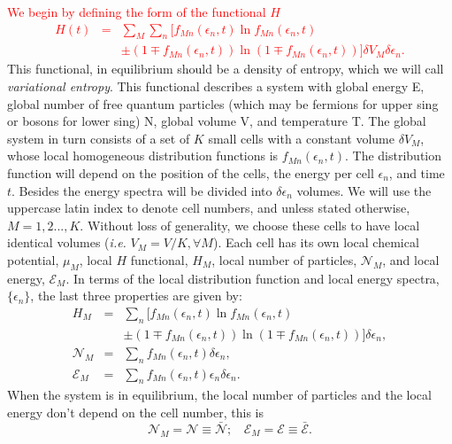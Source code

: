 \documentclass{article}
\begin{document}
\textcolor{red}{We begin by defining the form of the functional $H$
\begin{eqnarray}
    H(t)&=&\sum_{M} \sum_{n} [ f_{Mn}(\epsilon_{n},t) \ln f_{Mn}(\epsilon_{n},t)\nonumber \\
    &&\pm (1 \mp f_{Mn}(\epsilon_{n},t)) \ln (1 \mp f_{Mn}(\epsilon_{n},t)) ] \delta V_M \delta \epsilon_n \label{entropy}.
\end{eqnarray}}
This functional, in equilibrium should be a density of entropy, which we will call \textit{variational entropy}.
This functional describes a system with global energy E, global number of free
quantum particles (which may be fermions for upper sing or bosons for lower sing) N, global volume V, and temperature T. The
global system in turn consists of a set of $K$ small cells with a constant volume $\delta V_M$, whose local homogeneous distribution functions is $f_{Mn}(\epsilon_{n},t)$. The distribution function will depend on the position of the cells, the energy per cell $\epsilon_{n}$, and time $t$. Besides the energy spectra will be divided into $\delta \epsilon_n$ volumes. We will use the uppercase latin index to denote cell numbers, and unless stated otherwise, $M = 1, 2 . . . , K$. Without loss of generality, we choose these cells to have
local identical volumes (\textit{i.e.} $V_M = V/K, \forall M$). Each cell has its own local chemical potential, $\mu_M$, local
$H$ functional, $H_M$, local number of particles, $\mathcal{N}_M$, and local energy, $\mathcal{E}_M$. In terms of the local distribution
function and local energy spectra, $\{\epsilon_{n}\}$, the last three properties are given by:
\begin{eqnarray}
    H_M&=&  \sum_{n} [ f_{Mn}(\epsilon_{n},t) \ln f_{Mn}(\epsilon_{n},t)\nonumber \\
    &&\pm (1 \mp f_{Mn}(\epsilon_{n},t)) \ln (1 \mp f_{Mn}(\epsilon_{n},t)) ] \delta \epsilon_n \label{entropycell},\\
    {\mathcal{N}}_M&=& \sum_{n}f_{Mn}(\epsilon_{n} ,t) \delta \epsilon_n, \nonumber \\
{\mathcal{E}}_M&=& \sum_{n}f_{Mn}(\epsilon_{n},t)\epsilon_{n} \delta \epsilon_n.
\end{eqnarray}
When the system is in equilibrium, the local number of particles and the local energy don't depend on the cell number, this is
\begin{equation}
   {\mathcal{N}}_M=\mathcal{N}\equiv \bar{\mathcal{N}}; \ \ \ \  {\mathcal{E}}_M=\mathcal{E}\equiv \bar{\mathcal{E}}.
\end{equation}
\end{document}
